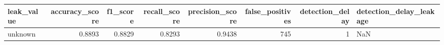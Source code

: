 \begin{tabular}{lrrrrrrl}
\toprule
leak\_value & accuracy\_score & f1\_score & recall\_score & precision\_score & false\_positives & detection\_delay & detection\_delay\_leakage \\
\midrule
unknown & 0.8893 & 0.8829 & 0.8293 & 0.9438 & 745 & 1 & NaN \\
\bottomrule
\end{tabular}
